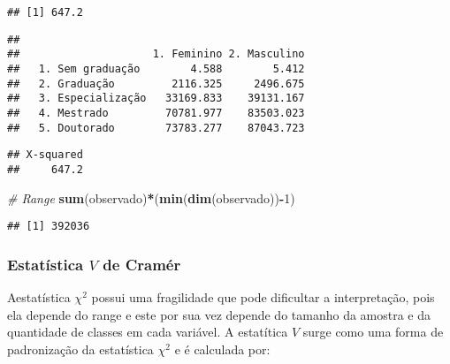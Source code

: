 \documentclass[11pt,]{style/krantz}
\makeatletter
\newenvironment{Shaded}{\begin{snugshade}}{\end{snugshade}}
\newcommand{\CommentTok}[1]{\textcolor[rgb]{0.56,0.35,0.01}{\textit{#1}}}
\newcommand{\DecValTok}[1]{\textcolor[rgb]{0.00,0.00,0.81}{#1}}
\newcommand{\KeywordTok}[1]{\textcolor[rgb]{0.13,0.29,0.53}{\textbf{#1}}}
\newcommand{\NormalTok}[1]{#1}
\newcommand{\OperatorTok}[1]{\textcolor[rgb]{0.81,0.36,0.00}{\textbf{#1}}}
\newcommand{\StringTok}[1]{\textcolor[rgb]{0.31,0.60,0.02}{#1}}
\newenvironment{kframe}{%
\medskip{}
\setlength{\fboxsep}{.8em}
 \def\at@end@of@kframe{}%
 \ifinner\ifhmode%
  \def\at@end@of@kframe{\end{minipage}}%
  \begin{minipage}{\columnwidth}%
 \fi\fi%
 \def\FrameCommand##1{\hskip\@totalleftmargin \hskip-\fboxsep
 \colorbox{shadecolor}{##1}\hskip-\fboxsep
     \hskip-\linewidth \hskip-\@totalleftmargin \hskip\columnwidth}%
 \MakeFramed {\advance\hsize-\width
   \@totalleftmargin\z@ \linewidth\hsize
   \@setminipage}}%
 {\par\unskip\endMakeFramed%
 \at@end@of@kframe}
\renewenvironment{Shaded}{\begin{kframe}}{\end{kframe}}
\theoremstyle{definition}
\theoremstyle{definition}
\theoremstyle{definition}
\theoremstyle{remark}
\makeatother
\begin{document}
\begin{verbatim}
## [1] 647.2
\end{verbatim}

\begin{Shaded}
\end{Shaded}

\begin{verbatim}
##
##                     1. Feminino 2. Masculino
##   1. Sem graduação        4.588        5.412
##   2. Graduação         2116.325     2496.675
##   3. Especialização   33169.833    39131.167
##   4. Mestrado         70781.977    83503.023
##   5. Doutorado        73783.277    87043.723
\end{verbatim}

\begin{Shaded}
\end{Shaded}

\begin{verbatim}
## X-squared
##     647.2
\end{verbatim}

\begin{Shaded}
\begin{Highlighting}[]
\CommentTok{# Range}
\KeywordTok{sum}\NormalTok{(observado)}\OperatorTok{*}\NormalTok{(}\KeywordTok{min}\NormalTok{(}\KeywordTok{dim}\NormalTok{(observado))}\OperatorTok{-}\DecValTok{1}\NormalTok{)}
\end{Highlighting}
\end{Shaded}

\begin{verbatim}
## [1] 392036
\end{verbatim}

\hypertarget{estatistica-v-de-cramer}{%
\subsubsection{\texorpdfstring{Estatística \(V\) de Cramér}{Estatística V de Cramér}}\label{estatistica-v-de-cramer}}

Aestatística \(\chi^2\) possui uma fragilidade que pode dificultar a interpretação, pois ela depende do range e este por sua vez depende do tamanho da amostra e da quantidade de classes em cada variável. A estatítica \(V\) surge como uma forma de padronização da estatística \(\chi^2\) e é calculada por:
\end{document}
